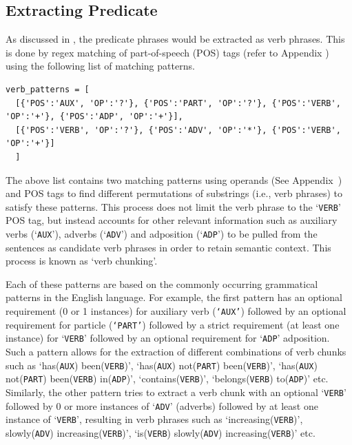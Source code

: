 \subsection{Extracting Predicate}

As discussed in , the predicate phrases would be extracted as verb phrases. This is done by regex matching of part-of-speech (POS) tags (refer to Appendix ) using the following list of matching patterns. 

\begin{verbatim}
verb_patterns = [
  [{'POS':'AUX', 'OP':'?'}, {'POS':'PART', 'OP':'?'}, {'POS':'VERB', 'OP':'+'}, {'POS':'ADP', 'OP':'+'}],
  [{'POS':'VERB', 'OP':'?'}, {'POS':'ADV', 'OP':'*'}, {'POS':'VERB', 'OP':'+'}]
  ]
\end{verbatim}

The above list contains two matching patterns using operands (See Appendix~) and POS tags to find different permutations of substrings (i.e., verb phrases) to satisfy these patterns. This process does not limit the verb phrase to the `\texttt{VERB}' POS tag, but instead accounts for other relevant information such as auxiliary verbs (`\texttt{AUX}'), adverbs (`\texttt{ADV}') and adposition (`\texttt{ADP}') to be pulled from the sentences as candidate verb phrases in order to retain semantic context. This process is known as `verb chunking'. 

Each of these patterns are based on the commonly occurring grammatical patterns in the English language. For example, the first pattern has an optional requirement (0 or 1 instances) for auxiliary verb (\texttt{`AUX'}) followed by an optional requirement for particle (\texttt{`PART'}) followed by a strict requirement (at least one instance) for `\texttt{VERB}' followed by an optional requirement for `\texttt{ADP}' adposition. Such a pattern allows for the extraction of different combinations of verb chunks such as `has(\texttt{AUX}) been(\texttt{VERB})', `has(\texttt{AUX}) not(\texttt{PART}) been(\texttt{VERB})', `has(\texttt{AUX}) not(\texttt{PART}) been(\texttt{VERB}) in(\texttt{ADP})', `contains(\texttt{VERB})', `belongs(\texttt{VERB}) to(\texttt{ADP})' etc. Similarly, the other pattern tries to extract a verb chunk with an optional `\texttt{VERB}' followed by 0 or more instances of `\texttt{ADV}' (adverbs) followed by at least one instance of `\texttt{VERB}', resulting in verb phrases such as `increasing(\texttt{VERB})', slowly(\texttt{ADV}) increasing(\texttt{VERB})', `is(\texttt{VERB}) slowly(\texttt{ADV}) increasing(\texttt{VERB})' etc. 

